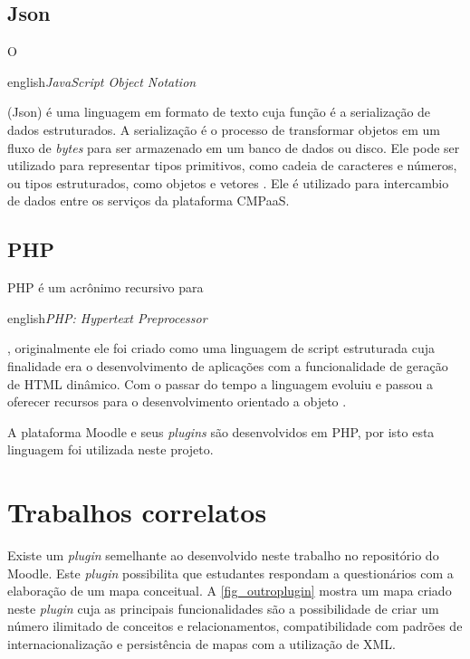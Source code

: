 \documentclass[
	12pt,				%
	openright,			%
	oneside,			%
	a4paper,			%
	english,			%
	french,				%
	spanish,			%
	brazil				%
	]{abntex2}
\begin{document}
\subsection{Json}

O \begin{otherlanguage*}{english}\textit{JavaScript Object Notation}\end{otherlanguage*} (Json) é uma linguagem em formato de texto cuja função é a serialização de dados estruturados. A serialização é o processo de transformar objetos em um fluxo de \textit{bytes} para ser armazenado em um banco de dados ou disco. Ele pode ser utilizado para representar tipos primitivos, como cadeia de caracteres e números, ou tipos estruturados, como objetos e vetores \cite{crockford2006}. Ele é utilizado para intercambio de dados entre os serviços da plataforma CMPaaS.  

\subsection{PHP}
PHP é um acrônimo recursivo para \begin{otherlanguage*}{english}\textit{PHP: Hypertext Preprocessor}\end{otherlanguage*}, originalmente ele foi criado como uma linguagem de script estruturada cuja finalidade era o desenvolvimento de aplicações com a funcionalidade de geração de HTML dinâmico. Com o passar do tempo a linguagem evoluiu e passou a oferecer recursos para o desenvolvimento orientado a objeto \cite{minetto2007}.

A plataforma Moodle e seus \textit{plugins} são desenvolvidos em PHP, por isto esta linguagem foi utilizada neste projeto. 

\section{Trabalhos correlatos}

Existe um \textit{plugin} semelhante ao desenvolvido neste trabalho no repositório do Moodle. Este \textit{plugin} possibilita que estudantes respondam a questionários com a elaboração de um mapa conceitual. A \autoref{fig_outroplugin} mostra um mapa criado neste \textit{plugin} cuja as principais funcionalidades são a possibilidade de criar um número ilimitado de conceitos e relacionamentos, compatibilidade com padrões de internacionalização e persistência de mapas com a utilização de XML. 
\end{document}
